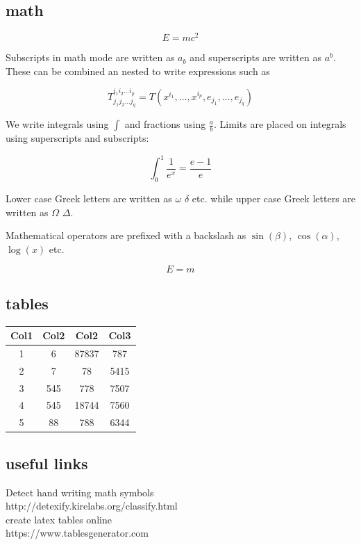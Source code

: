 \documentclass{article}
\begin{document}
\subsection{math}
$$E=mc^2$$

Subscripts in math mode are written as $a_b$ and superscripts are written as $a^b$. These can be combined an nested to write expressions such as

$$T^{i_1 i_2 \dots i_p}_{j_1 j_2 \dots j_q} = T(x^{i_1},\dots,x^{i_p},e_{j_1},\dots,e_{j_q})$$

We write integrals using $\int$ and fractions using $\frac{a}{b}$. Limits are placed on integrals using superscripts and subscripts:

$$\int_0^1 \frac{1}{e^x} =  \frac{e-1}{e}$$

Lower case Greek letters are written as $\omega$ $\delta$ etc. while upper case Greek letters are written as $\Omega$ $\Delta$.

Mathematical operators are prefixed with a backslash as $\sin(\beta)$, $\cos(\alpha)$, $\log(x)$ etc.

\begin{equation}
E=m
\end{equation}
\subsection{tables}
\begin{center}
    \begin{tabular}{||c c c c||} 
    \hline
    Col1 & Col2 & Col2 & Col3 \\ [0.5ex] 
    \hline\hline
    1 & 6 & 87837 & 787 \\ 
    \hline
    2 & 7 & 78 & 5415 \\
    \hline
    3 & 545 & 778 & 7507 \\
    \hline
    4 & 545 & 18744 & 7560 \\
    \hline
    5 & 88 & 788 & 6344 \\ [1ex] 
    \hline
   \end{tabular}
   \end{center}
\subsection{useful links}
Detect hand writing math symbols\\
http://detexify.kirelabs.org/classify.html\\
create latex tables online\\
https://www.tablesgenerator.com



     
\end{document}
